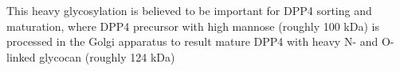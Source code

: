 This heavy glycosylation is believed to be important for DPP4 sorting and maturation, where DPP4 precursor with high mannose (roughly 100 kDa) is processed in the Golgi apparatus to result mature DPP4 with heavy N- and O-linked glycocan (roughly 124 kDa)~\cite{Matter_1991}